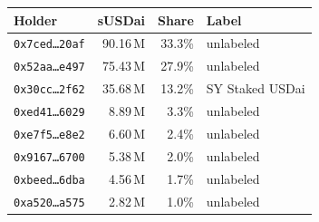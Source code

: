 \begin{tabular}{@{}lrrl@{}}
\toprule
Holder & sUSDai & Share & Label \\
\midrule
\texttt{0x7ced\ldots{}20af} & 90.16\,M & 33.3\% & unlabeled \\
\texttt{0x52aa\ldots{}e497} & 75.43\,M & 27.9\% & unlabeled \\
\texttt{0x30cc\ldots{}2f62} & 35.68\,M & 13.2\% & SY Staked USDai \\
\texttt{0xed41\ldots{}6029} & 8.89\,M & 3.3\% & unlabeled \\
\texttt{0xe7f5\ldots{}e8e2} & 6.60\,M & 2.4\% & unlabeled \\
\texttt{0x9167\ldots{}6700} & 5.38\,M & 2.0\% & unlabeled \\
\texttt{0xbeed\ldots{}6dba} & 4.56\,M & 1.7\% & unlabeled \\
\texttt{0xa520\ldots{}a575} & 2.82\,M & 1.0\% & unlabeled \\
\bottomrule
\end{tabular}

